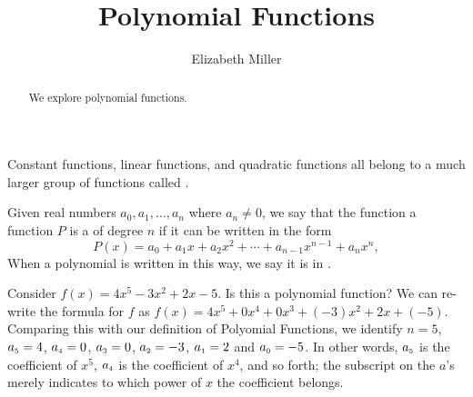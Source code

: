\documentclass{ximera}
\author{Elizabeth Miller}
\title{Polynomial Functions}
\begin{document}
\begin{abstract}
We explore polynomial functions.
\end{abstract}
\maketitle
\licenseSZ


Constant functions, linear functions, and quadratic functions all belong to a much larger group of functions called .  

\begin{definition}
Given real numbers $a_0, a_1, \ldots, a_n$ where $a_n \neq 0$, we say that the function a function $P$ is a  of degree $n$ if
it can be written in the form%
$$
P(x) = a_0 + a_1 x + a_2 x^2 + \cdots + a_{n-1}x^{n-1} + a_n x^n, 
$$
When a polynomial is written in this way, we say it is in .
\end{definition}

Consider $f(x) = 4x^5 - 3x^2 + 2x - 5$.  Is this a polynomial function?  We can re-write the formula for $f$ as $f(x)= 4x^5 + 0 x^{4} + 0 x^{3} + (-3)x^2 + 2 x + (-5).$  Comparing this with our definition of Polyomial Functions, we identify $n=5$, $a_{\mbox{\tiny $5$}} = 4$, $a_{\mbox{\tiny $4$}} = 0$, $a_{\mbox{\tiny $3$}} = 0$, $a_{\mbox{\tiny $2$}} = -3$, $a_{\mbox{\tiny $1$}} = 2$ and $a_{\mbox{\tiny $0$}} = -5$.  In other words, $a_{\mbox{\tiny $5$}}$ is the coefficient of $x^{5}$, $a_{\mbox{\tiny $4$}}$ is the coefficient of $x^{4}$, and so forth;  the subscript on the $a$'s merely indicates to which power of $x$ the coefficient belongs.  
\end{document}
